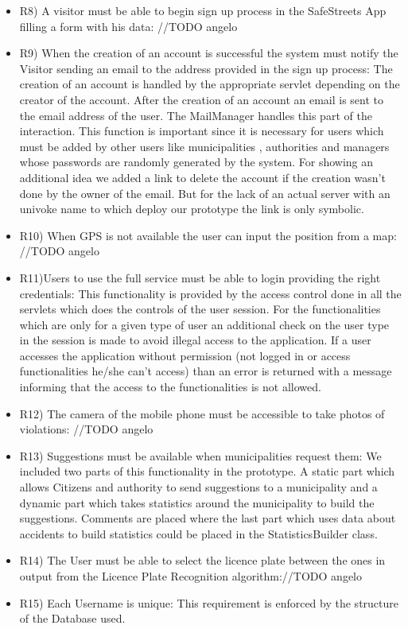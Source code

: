 \begin{itemize}
\item  R8) A visitor must be able to begin sign up process in the SafeStreets App filling a form with his
data: //TODO angelo

\item  R9) When the creation of an account is successful the system must notify the Visitor sending an
email to the address provided in the sign up process: The creation of an account is handled by the appropriate servlet depending on the creator of the account. After the creation of an account an email is sent to the email address of the user. The MailManager
handles this part of the interaction. This function is important since it is necessary for users which must be added by other users like municipalities , authorities and managers whose passwords are randomly generated by the system.
For showing an additional idea we added a link to delete the account if the creation wasn't done by the owner of the email.
But for the lack of an actual server with an univoke name to which deploy our prototype the link is only symbolic.


\item  R10) When GPS is not available the user can input the position from a map: //TODO angelo

\item  R11)Users to use the full service must be able to login providing the right credentials: This functionality is provided by the
access control done in all the servlets which does the controls of the user session. For the functionalities which are only for a given type of user an additional check on the user type in the session is made to avoid illegal access to the application. If a user accesses the application without permission (not logged in or access functionalities he/she can't access) than an error is returned with a message informing that the access to the functionalities is not allowed. 

\item  R12) The camera of the mobile phone must be accessible to take photos of violations: //TODO angelo

\item  R13) Suggestions must be available when municipalities request them: We included two parts of this functionality in the prototype. A static part which allows Citizens and authority to send suggestions to a municipality and a dynamic part which takes statistics around the municipality to build the suggestions. Comments are placed where the last part which uses data about accidents to build statistics could be placed in the StatisticsBuilder class.

\item  R14) The User must be able to select the licence plate between the ones in output from the Licence
Plate Recognition algorithm://TODO angelo

\item  R15) Each Username is unique:  This requirement is enforced by the structure of the Database used.
\end{itemize}
\clearpage

